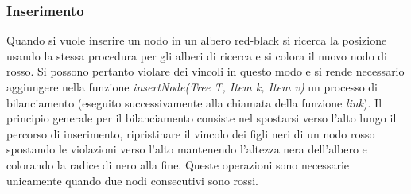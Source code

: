 \subsubsection{Inserimento}
Quando si vuole inserire un nodo in un albero red-black si ricerca la posizione usando la stessa procedura per gli alberi di ricerca e si colora il nuovo 
nodo di rosso. Si possono pertanto violare dei vincoli in questo modo e si rende necessario aggiungere nella funzione \emph{insertNode(Tree T, Item k, Item 
v)} un processo di bilanciamento (eseguito successivamente alla chiamata della funzione \emph{link}). Il principio generale per il bilanciamento consiste 
nel spostarsi verso l'alto lungo il percorso di inserimento, ripristinare il vincolo dei figli neri di un nodo rosso spostando le violazioni verso l'alto
mantenendo l'altezza nera dell'albero e colorando la radice di nero alla fine. Queste operazioni sono necessarie unicamente quando due nodi consecutivi sono
rossi. 
